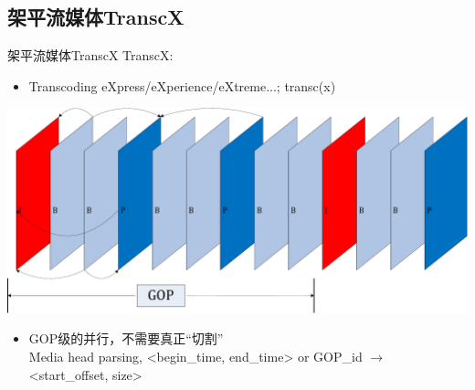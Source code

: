 \documentclass{beamer}
\begin{document}
\subsection{架平流媒体TranscX}
\begin{frame}{架平流媒体TranscX}
TranscX: 
\begin{itemize}
	\item Transcoding eXpress/eXperience/eXtreme...; transc(x)
\end{itemize}
\pause
\begin{center}
\includegraphics[scale=0.20]{fig/GOP.pdf}
\end{center}
\begin{itemize}
\item GOP级的并行，不需要真正“切割”\\
Media head parsing, <begin\_time, end\_time> or GOP\_id $\rightarrow$ <start\_offset, size>
\end{itemize}
\end{frame}
\end{document}
